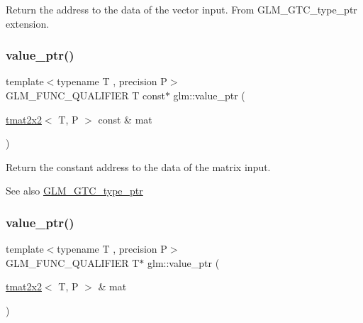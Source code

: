 Return the address to the data of the vector input. From G\+L\+M\+\_\+\+G\+T\+C\+\_\+type\+\_\+ptr extension. \mbox{\label{group__gtc__type__ptr_ga2d709523aa0beb0a42433f80c9d07718}} 
\subsubsection{\texorpdfstring{value\+\_\+ptr()}{value\_ptr()}\hspace{0.1cm}{\footnotesize\ttfamily [8/27]}}
{\footnotesize\ttfamily template$<$typename T , precision P$>$ \\
G\+L\+M\+\_\+\+F\+U\+N\+C\+\_\+\+Q\+U\+A\+L\+I\+F\+I\+ER T const$\ast$ glm\+::value\+\_\+ptr (\begin{DoxyParamCaption}\item[{\hyperlink{structglm_1_1tmat2x2}{tmat2x2}$<$ T, P $>$ const \&}]{mat }\end{DoxyParamCaption})}

Return the constant address to the data of the matrix input. \begin{DoxySeeAlso}{See also}
\hyperlink{group__gtc__type__ptr}{G\+L\+M\+\_\+\+G\+T\+C\+\_\+type\+\_\+ptr} 
\end{DoxySeeAlso}
\mbox{\label{group__gtc__type__ptr_gac7256e14328e818e61276fa5e6176b9d}} 
\subsubsection{\texorpdfstring{value\+\_\+ptr()}{value\_ptr()}\hspace{0.1cm}{\footnotesize\ttfamily [9/27]}}
{\footnotesize\ttfamily template$<$typename T , precision P$>$ \\
G\+L\+M\+\_\+\+F\+U\+N\+C\+\_\+\+Q\+U\+A\+L\+I\+F\+I\+ER T$\ast$ glm\+::value\+\_\+ptr (\begin{DoxyParamCaption}\item[{\hyperlink{structglm_1_1tmat2x2}{tmat2x2}$<$ T, P $>$ \&}]{mat }\end{DoxyParamCaption})}

